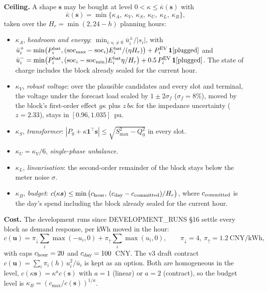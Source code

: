 \documentclass[11pt]{article}
\theoremstyle{definition}
\newcommand{\tp}{^{\top}}
\newcommand{\one}{\mathbf{1}}
\newcommand{\bu}{\bm{u}}
\newcommand{\bs}{\bm{s}}
\begin{document}
{\textbf{Ceiling.} A shape $\bs$ may be bought at level $0<\kappa\le\bar\kappa(\bs)$ with
\begin{equation}\label{eq:ceiling}
  \bar\kappa(\bs)=\min\{\kappa_A,\ \kappa_V,\ \kappa_S,\ \kappa_U,\ \kappa_L,\ \kappa_B\},
\end{equation}
taken over the $H_r=\min(2,24-h)$ planning hours:
\begin{itemize}
  \item $\kappa_A$, \emph{headroom and energy}: $\min_{i:s_i\neq0}\bar u_i^{\pm}/|s_i|$, with
        $\bar u_i^{+}=\min\!\big(P^{\rm bat}_i,(\mathrm{soc}_{\max}-\mathrm{soc}_i)E_i^{\rm bat}/(\eta H_r)\big)+P^{\rm EV}_i\,\one[\text{plugged}]$ and
        $\bar u_i^{-}=\min\!\big(P^{\rm bat}_i,(\mathrm{soc}_i-\mathrm{soc}_{\min})E_i^{\rm bat}\eta/H_r\big)+0.5\,P^{\rm EV}_i\,\one[\text{plugged}]$.
        The state of charge includes the block already sealed for the current hour.
  \item $\kappa_V$, \emph{robust voltage}: over the plausible candidates and every slot and terminal, the voltage under the forecast load scaled by $1\pm2\sigma_f$ ($\sigma_f=8\%$), moved by the block's first-order effect $g\kappa$ plus $z\,b\kappa$ for the impedance uncertainty ($z=2.33$), stays in $[0.96,1.035]$~pu.
  \item $\kappa_S$, \emph{transformer}: $|P_0+\kappa\one\tp\bs|\le\sqrt{S_{\max}^2-Q_0^2}$ in every slot.
  \item $\kappa_U=\kappa_V/6$, \emph{single-phase unbalance}.
  \item $\kappa_L$, \emph{linearisation}: the second-order remainder of the block stays below the meter noise $\sigma$.
  \item $\kappa_B$, \emph{budget}: $c(\kappa\bs)\le\min\big(c_{\rm hour},\,(c_{\rm day}-c_{\rm committed})/H_r\big)$, where $c_{\rm committed}$ is the day's spend including the block already sealed for the current hour.
\end{itemize}

\textbf{Cost.} The development runs since DEVELOPMENT\_RUNS \S16 settle every block as demand response, per kWh moved in the hour:
\begin{equation}\label{eq:cost}
  c(\bu)=\pi_\downarrow\sum_i\max(-u_i,0)+\pi_\uparrow\sum_i\max(u_i,0),\qquad \pi_\downarrow=4,\ \pi_\uparrow=1.2\ \text{CNY/kWh},
\end{equation}
with caps $c_{\rm hour}=20$ and $c_{\rm day}=100$~CNY. The v3 draft contract $c(\bu)=\sum_i\pi_i(h)\,u_i^2/\bar u_i$ is kept as an option. Both are homogeneous in the level, $c(\kappa\bs)=\kappa^{a}c(\bs)$ with $a=1$ (linear) or $a=2$ (contract), so the budget level is $\kappa_B=(c_{\max}/c(\bs))^{1/a}$.

}
\end{document}
